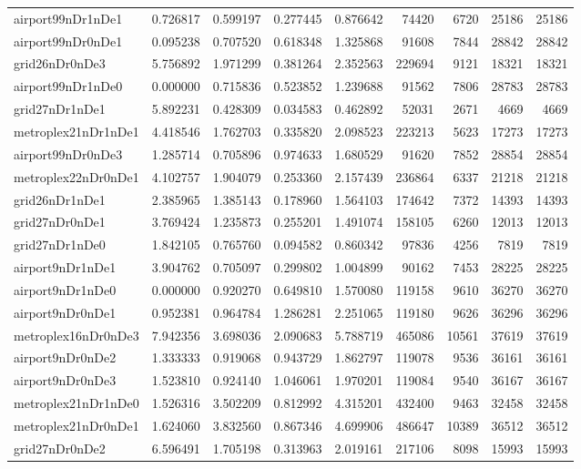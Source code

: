 \documentclass[../../../thesis.tex]{subfiles}
\begin{document}
\begin{longtable}{|l|r|r|r|r|r|r|r|r|}
airport99nDr1nDe1 & 0.726817 & 0.599197 & 0.277445 & 0.876642 & 74420 & 6720 & 25186 & 25186 \\
airport99nDr0nDe1 & 0.095238 & 0.707520 & 0.618348 & 1.325868 & 91608 & 7844 & 28842 & 28842 \\
grid26nDr0nDe3 & 5.756892 & 1.971299 & 0.381264 & 2.352563 & 229694 & 9121 & 18321 & 18321 \\
airport99nDr1nDe0 & 0.000000 & 0.715836 & 0.523852 & 1.239688 & 91562 & 7806 & 28783 & 28783 \\
grid27nDr1nDe1 & 5.892231 & 0.428309 & 0.034583 & 0.462892 & 52031 & 2671 & 4669 & 4669 \\
metroplex21nDr1nDe1 & 4.418546 & 1.762703 & 0.335820 & 2.098523 & 223213 & 5623 & 17273 & 17273 \\
airport99nDr0nDe3 & 1.285714 & 0.705896 & 0.974633 & 1.680529 & 91620 & 7852 & 28854 & 28854 \\
metroplex22nDr0nDe1 & 4.102757 & 1.904079 & 0.253360 & 2.157439 & 236864 & 6337 & 21218 & 21218 \\
grid26nDr1nDe1 & 2.385965 & 1.385143 & 0.178960 & 1.564103 & 174642 & 7372 & 14393 & 14393 \\
grid27nDr0nDe1 & 3.769424 & 1.235873 & 0.255201 & 1.491074 & 158105 & 6260 & 12013 & 12013 \\
grid27nDr1nDe0 & 1.842105 & 0.765760 & 0.094582 & 0.860342 & 97836 & 4256 & 7819 & 7819 \\
airport9nDr1nDe1 & 3.904762 & 0.705097 & 0.299802 & 1.004899 & 90162 & 7453 & 28225 & 28225 \\
airport9nDr1nDe0 & 0.000000 & 0.920270 & 0.649810 & 1.570080 & 119158 & 9610 & 36270 & 36270 \\
airport9nDr0nDe1 & 0.952381 & 0.964784 & 1.286281 & 2.251065 & 119180 & 9626 & 36296 & 36296 \\
metroplex16nDr0nDe3 & 7.942356 & 3.698036 & 2.090683 & 5.788719 & 465086 & 10561 & 37619 & 37619 \\
airport9nDr0nDe2 & 1.333333 & 0.919068 & 0.943729 & 1.862797 & 119078 & 9536 & 36161 & 36161 \\
airport9nDr0nDe3 & 1.523810 & 0.924140 & 1.046061 & 1.970201 & 119084 & 9540 & 36167 & 36167 \\
metroplex21nDr1nDe0 & 1.526316 & 3.502209 & 0.812992 & 4.315201 & 432400 & 9463 & 32458 & 32458 \\
metroplex21nDr0nDe1 & 1.624060 & 3.832560 & 0.867346 & 4.699906 & 486647 & 10389 & 36512 & 36512 \\
grid27nDr0nDe2 & 6.596491 & 1.705198 & 0.313963 & 2.019161 & 217106 & 8098 & 15993 & 15993 \\

\end{longtable}
\end{document}
